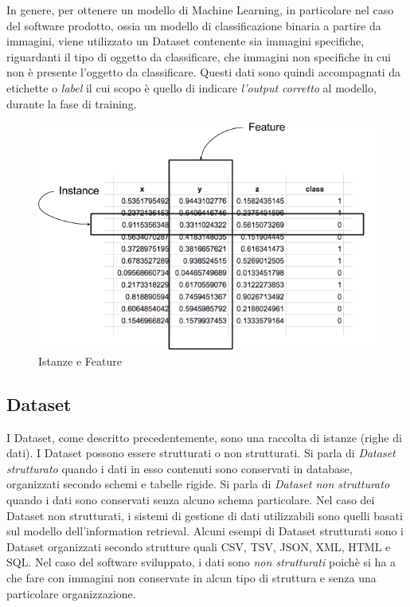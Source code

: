 In genere, per ottenere un modello di Machine Learning, in particolare nel caso del software prodotto, ossia un modello  di classificazione binaria a partire da immagini, viene utilizzato un Dataset contenente sia immagini specifiche, riguardanti il tipo di oggetto da classificare, che immagini non specifiche in cui non è presente l'oggetto da classificare. Questi dati sono quindi accompagnati da etichette o \emph{label} il cui scopo è quello di indicare \emph{l'output corretto} al modello, durante la fase di training.
\begin{figure}[h!]
	\centering
	\includegraphics[width=120mm]{img/2/ds_1_1.png}
	\caption{\fontsize{10px}{0mm}\selectfont Istanze e Feature\label{fig:ds_1_1}}
\end{figure}\newline
\subsection{Dataset}
I Dataset, come descritto precedentemente, sono una raccolta di istanze (righe di dati). I Dataset possono essere strutturati o non strutturati. Si parla di \emph{Dataset strutturato} quando i dati in esso contenuti sono conservati in database, organizzati secondo schemi e tabelle rigide. Si parla di \emph{Dataset non strutturato} quando i dati sono conservati senza alcuno schema particolare. Nel caso dei Dataset non strutturati, i sistemi di gestione di dati utilizzabili sono quelli basati sul modello dell’information retrieval.
Alcuni esempi di Dataset strutturati sono i Dataset organizzati secondo strutture quali \ac{CSV}, \ac{TSV}, \ac{JSON}, \ac{XML}, \ac{HTML} e \ac{SQL}.
Nel caso del software sviluppato, i dati sono \textit{non strutturati} poichè si ha a che fare con immagini non conservate in alcun tipo di struttura e senza una particolare organizzazione.


